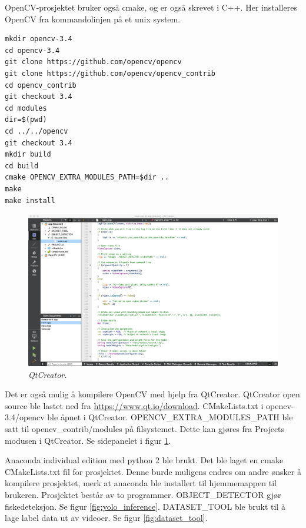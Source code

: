 OpenCV-prosjektet bruker også cmake, og er også skrevet i C++. Her installeres OpenCV fra kommandolinjen på et unix system.

\begin{verbatim}
mkdir opencv-3.4
cd opencv-3.4
git clone https://github.com/opencv/opencv
git clone https://github.com/opencv/opencv_contrib
cd opencv_contrib
git checkout 3.4
cd modules
dir=$(pwd)
cd ../../opencv
git checkout 3.4
mkdir build
cd build
cmake OPENCV_EXTRA_MODULES_PATH=$dir ..
make
make install
\end{verbatim}

\begin{figure}
\begin{center} 
\includegraphics[scale=0.2]{figures/qtcreator}
\caption{\small \sl QtCreator. \label{fig:qtcreator}} 
\end{center} 
\end{figure} 

Det er også mulig å kompilere OpenCV med hjelp fra QtCreator. QtCreator open source ble lastet ned fra \url{https://www.qt.io/download}. CMakeLists.txt i opencv-3.4/opencv ble åpnet i QtCreator. OPENCV\_EXTRA\_MODULES\_PATH ble satt til opencv\_contrib/modules på filsystemet. Dette kan gjøres fra Projects modusen i QtCreator. Se sidepanelet i figur \ref{fig:qtcreator}.

Anaconda individual edition med python 2 ble brukt. Det ble laget en cmake CMakeLists.txt fil for prosjektet. Denne burde muligens endres om andre ønsker å kompilere prosjektet, merk at anaconda ble installert til hjemmemappen til brukeren. Prosjektet består av to programmer. OBJECT\_DETECTOR gjør fiskedeteksjon. Se figur \ref{fig:yolo_inference}. DATASET\_TOOL ble brukt til å lage label data ut av videoer. Se figur \ref{fig:dataset_tool}.


